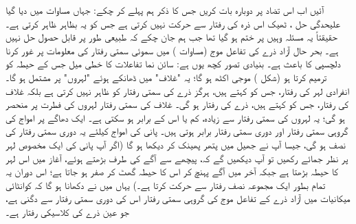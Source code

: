 آئیں اب اس تضاد پر دوبارہ بات کریں جس کا ذکر ہم پہلے کر چکے: جہاں مساوات  میں دیا گیا علیحدگی حل ، ٹھیک اس ذرہ کی رفتار سے حرکت نہیں کرتی ہے جس کو یہ بظاہر ظاہر کرتی ہے۔ حقیقتاً یہ مسئلہ وہیں پر ختم ہو گیا تھا جب ہم جان چکے کہ  طبیعی طور پر قابل حصول حل نہیں ہے۔ بحر حال آزاد ذرے کی تفاعل موج (مساوات ) میں سموئی سمتی رفتار کی معلومات پر غور کرنا دلچسپی کا باعث ہے۔ بنیادی تصور کچھ یوں ہے: سائن نما تفاعلات کا خطی میل جس کے حیطہ کو  ترمیم کرتا ہو (شکل ) موجی اکٹھ ہو گا؛ یہ "غلاف" میں ڈھانکے ہوئے "لہروں" پر مشتمل ہو گا۔ انفرادی لہر کی رفتار، جس کو   کہتے ہیں، ہرگز ذرے کی سمتی رفتار کو ظاہر نہیں کرتی ہے بلکہ غلاف کی رفتار، جس کو  کہتے ہیں، ذرے کی رفتار ہو گی۔ غلاف کی سمتی رفتار لہروں کی فطرت پر منحصر ہو گی؛ یہ لہروں کی سمتی رفتار سے زیادہ، کم یا اس کے برابر ہو سکتی ہے۔ ایک دھاگے پر امواج کی گروہی سمتی رفتار اور دوری سمتی رفتار  برابر ہوتی ہیں۔ پانی کی امواج کیلئے یہ دوری سمتی رفتار کی نصف ہو گی، جیسا آپ نے جھیل میں پتھر پھینک کر دیکھا ہو گا (اگر آپ پانی کی ایک مخصوص لہر پر نظر جمائے رکھیں تو آپ دیکھیں گے کہ، پیچھے سے آگے کی طرف بڑھتے ہوئے، آغاز میں اس لہر کا حیطہ بڑھتا ہے جبکہ آخر میں آگے پہنچ کر اس کا حیطہ گھٹ کر صفر ہو جاتا ہے؛ اس دوران یہ تمام بطور ایک مجموعہ نصف رفتار سے حرکت کرتا ہے۔) یہاں میں نے دکھانا ہو گا کہ کوانٹائی میکانیات میں آزاد ذرے کے تفاعل موج کی گروہی سمتی رفتار اس کی دوری سمتی رفتار سے دگنی ہے، جو عین ذرے کی کلاسیکی رفتار ہے۔

